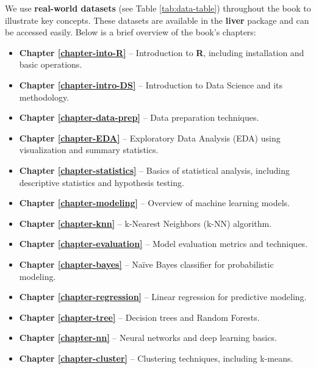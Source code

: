 \documentclass[
]{book}
\providecommand{\tightlist}{%
  \setlength{\itemsep}{0pt}\setlength{\parskip}{0pt}}
\theoremstyle{definition}
\theoremstyle{definition}
\theoremstyle{definition}
\theoremstyle{definition}
\theoremstyle{remark}
\begin{document}
We use \textbf{real-world datasets} (see Table \ref{tab:data-table}) throughout the book to illustrate key concepts. These datasets are available in the \textbf{liver} package and can be accessed easily. Below is a brief overview of the book's chapters:

\begin{itemize}
\tightlist
\item
  \textbf{Chapter \ref{chapter-into-R}} -- Introduction to \textbf{R}, including installation and basic operations.\\
\item
  \textbf{Chapter \ref{chapter-intro-DS}} -- Introduction to Data Science and its methodology.\\
\item
  \textbf{Chapter \ref{chapter-data-prep}} -- Data preparation techniques.\\
\item
  \textbf{Chapter \ref{chapter-EDA}} -- Exploratory Data Analysis (EDA) using visualization and summary statistics.\\
\item
  \textbf{Chapter \ref{chapter-statistics}} -- Basics of statistical analysis, including descriptive statistics and hypothesis testing.\\
\item
  \textbf{Chapter \ref{chapter-modeling}} -- Overview of machine learning models.\\
\item
  \textbf{Chapter \ref{chapter-knn}} -- k-Nearest Neighbors (k-NN) algorithm.\\
\item
  \textbf{Chapter \ref{chapter-evaluation}} -- Model evaluation metrics and techniques.\\
\item
  \textbf{Chapter \ref{chapter-bayes}} -- Naïve Bayes classifier for probabilistic modeling.\\
\item
  \textbf{Chapter \ref{chapter-regression}} -- Linear regression for predictive modeling.\\
\item
  \textbf{Chapter \ref{chapter-tree}} -- Decision trees and Random Forests.\\
\item
  \textbf{Chapter \ref{chapter-nn}} -- Neural networks and deep learning basics.\\
\item
  \textbf{Chapter \ref{chapter-cluster}} -- Clustering techniques, including k-means.
\end{itemize}
\end{document}
